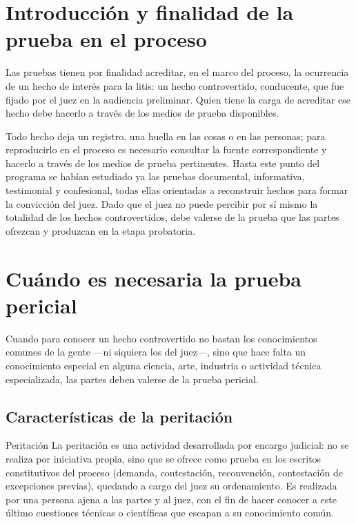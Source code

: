 \documentclass[12pt,oneside]{book}
\begin{document}
\section{Introducción y finalidad de la prueba en el proceso}

Las pruebas tienen por finalidad acreditar, en el marco del proceso, la ocurrencia de un hecho de interés para la litis: un hecho controvertido, conducente, que fue fijado por el juez en la audiencia preliminar. Quien tiene la carga de acreditar ese hecho debe hacerlo a través de los medios de prueba disponibles.

Todo hecho deja un registro, una huella en las cosas o en las personas; para reproducirlo en el proceso es necesario consultar la fuente correspondiente y hacerlo a través de los medios de prueba pertinentes. Hasta este punto del programa se habían estudiado ya las pruebas documental, informativa, testimonial y confesional, todas ellas orientadas a reconstruir hechos para formar la convicción del juez. Dado que el juez no puede percibir por sí mismo la totalidad de los hechos controvertidos, debe valerse de la prueba que las partes ofrezcan y produzcan en la etapa probatoria.

\section{Cuándo es necesaria la prueba pericial}

Cuando para conocer un hecho controvertido no bastan los conocimientos comunes de la gente —ni siquiera los del juez—, sino que hace falta un conocimiento especial en alguna ciencia, arte, industria o actividad técnica especializada, las partes deben valerse de la prueba pericial.

\subsection{Características de la peritación}

\begin{definition}{Peritación}
La peritación es una actividad desarrollada por encargo judicial: no se realiza por iniciativa propia, sino que se ofrece como prueba en los escritos constitutivos del proceso (demanda, contestación, reconvención, contestación de excepciones previas), quedando a cargo del juez su ordenamiento. Es realizada por una persona ajena a las partes y al juez, con el fin de hacer conocer a este último cuestiones técnicas o científicas que escapan a su conocimiento común.
\end{definition}
\end{document}
